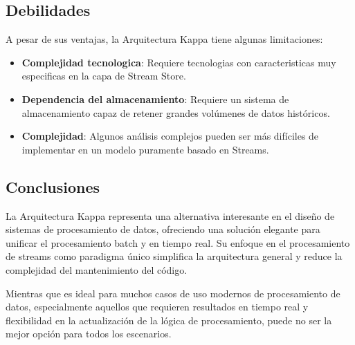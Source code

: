 \subsection{Debilidades}
A pesar de sus ventajas, la Arquitectura Kappa tiene algunas limitaciones:
\begin{itemize}
    \item \textbf{Complejidad tecnologica}: Requiere tecnologias con caracteristicas muy especificas en la capa de Stream Store.
    \item \textbf{Dependencia del almacenamiento}: Requiere un sistema de almacenamiento capaz de retener grandes volúmenes de datos históricos.
    \item \textbf{Complejidad}: Algunos análisis complejos pueden ser más difíciles de implementar en un modelo puramente basado en Streams.
\end{itemize}

\subsection{Conclusiones}
La Arquitectura Kappa representa una alternativa interesante en el diseño de sistemas de procesamiento de datos, 
ofreciendo una solución elegante para unificar el procesamiento batch y en tiempo real. 
Su enfoque en el procesamiento de streams como paradigma único simplifica la arquitectura general y reduce la complejidad del mantenimiento del código.

Mientras que es ideal para muchos casos de uso modernos de procesamiento de datos, 
especialmente aquellos que requieren resultados en tiempo real y flexibilidad en la actualización de la lógica de procesamiento, 
puede no ser la mejor opción para todos los escenarios.
\newpage